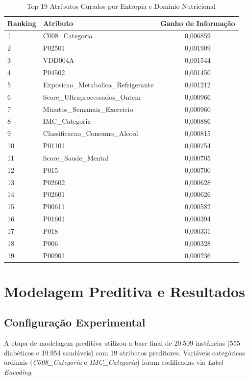 \documentclass[12pt, a4paper]{article}
\begin{document}
\begin{table}[h]
    \centering
    \caption{Top 19 Atributos Curados por Entropia e Domínio Nutricional}
    \label{tab:ganho_informacao}
    \begin{tabular}{llc}
    \toprule
    \textbf{Ranking} & \textbf{Atributo} & \textbf{Ganho de Informação} \\ \midrule
    1 & C008\_Categoria & 0,006859 \\
    2 & P02501 & 0,001909 \\
    3 & VDD004A & 0,001544 \\
    4 & P04502 & 0,001450 \\
    5 & Exposicao\_Metabolica\_Refrigerante & 0,001212 \\
    6 & Score\_Ultraprocessados\_Ontem & 0,000966 \\
    7 & Minutos\_Semanais\_Exercicio & 0,000960 \\
    8 & IMC\_Categoria & 0,000886 \\
    9 & Classificacao\_Consumo\_Alcool & 0,000815 \\
    10 & P01101 & 0,000754 \\
    11 & Score\_Saude\_Mental & 0,000705 \\
    12 & P015 & 0,000700 \\
    13 & P02602 & 0,000628 \\
    14 & P02601 & 0,000626 \\
    15 & P00611 & 0,000582 \\
    16 & P01601 & 0,000394 \\
    17 & P018 & 0,000331 \\
    18 & P006 & 0,000328 \\
    19 & P00901 & 0,000236 \\ \bottomrule
    \end{tabular}
\end{table}

\newpage

    \section{Modelagem Preditiva e Resultados}

    \subsection{Configuração Experimental}

    A etapa de modelagem preditiva utilizou a base final de 20.509 instâncias (555 diabéticos e 19.954 saudáveis) com 19 atributos preditores. Variáveis categóricas ordinais (\textit{C008\_Categoria} e \textit{IMC\_Categoria}) foram codificadas via \textit{Label Encoding}.
\end{document}

